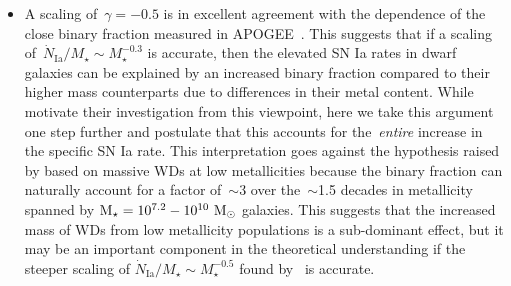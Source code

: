 \documentclass[ms.tex]{subfiles}
\begin{document}
\begin{itemize}
	\item A scaling of~$\gamma = -0.5$ is in excellent agreement with the
	dependence of the close binary fraction measured in APOGEE~\citep{Moe2019}.
	This suggests that if a scaling of~$\dot{N}_\text{Ia} / M_\star \sim
	M_\star^{-0.3}$ is accurate, then the elevated SN Ia rates in dwarf
	galaxies can be explained by an increased binary fraction compared to their
	higher mass counterparts due to differences in their metal content.
	While~\citet{Gandhi2022} motivate their investigation from this viewpoint,
	here we take this argument one step further and postulate that this
	accounts for the~\textit{entire} increase in the specific SN Ia rate.
	This interpretation goes against the hypothesis raised by
	\citet{Kistler2013} based on massive WDs at low metallicities
	\citep{Umeda1999, Willson2000, Marigo2007, Meng2008, Zhao2012, Kalirai2014}
	because the binary fraction can naturally account for a factor of~$\sim$3
	over the~$\sim$1.5 decades in metallicity spanned by
	$\text{M}_\star = 10^{7.2} - 10^{10}~\text{M}_\odot$ galaxies.
	This suggests that the increased mass of WDs from low metallicity
	populations is a sub-dominant effect, but it may be an important component
	in the theoretical understanding if the steeper scaling of
	$\dot{N}_\text{Ia} / M_\star \sim M_\star^{-0.5}$ found by~\citet{Brown2019}
	is accurate.


\end{itemize}
\end{document}
